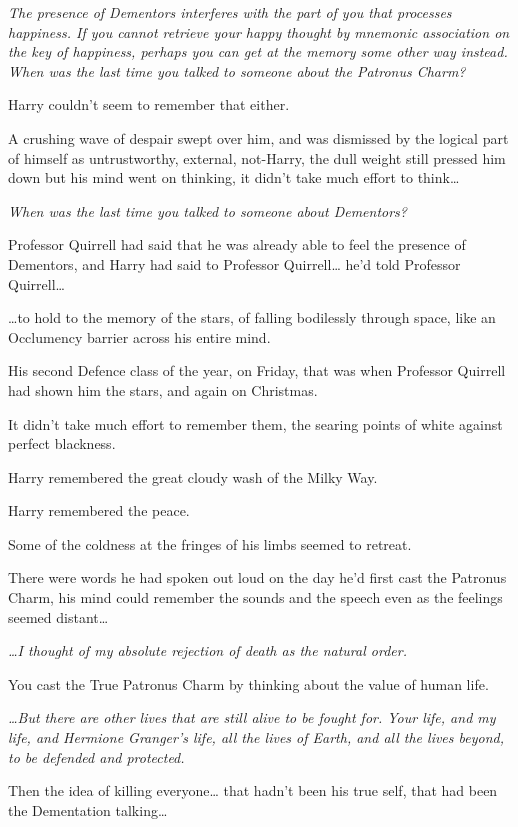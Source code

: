 \emph{The presence of Dementors interferes with the part of you that
processes happiness. If you cannot retrieve your happy thought by
mnemonic association on the key of happiness, perhaps you can get at the
memory some other way instead. When was the last time you talked to
someone about the Patronus Charm?}

Harry couldn't seem to remember that either.

A crushing wave of despair swept over him, and was dismissed by the
logical part of himself as untrustworthy, external, not-Harry, the dull
weight still pressed him down but his mind went on thinking, it didn't
take much effort to think\ldots{}

\emph{When was the last time you talked to someone about Dementors?}

Professor Quirrell had said that he was already able to feel the
presence of Dementors, and Harry had said to Professor Quirrell\ldots{}
he'd told Professor Quirrell\ldots{}

\ldots{}to hold to the memory of the stars, of falling bodilessly
through space, like an Occlumency barrier across his entire mind.

His second Defence class of the year, on Friday, that was when Professor
Quirrell had shown him the stars, and again on Christmas.

It didn't take much effort to remember them, the searing points of white
against perfect blackness.

Harry remembered the great cloudy wash of the Milky Way.

Harry remembered the peace.

Some of the coldness at the fringes of his limbs seemed to retreat.

There were words he had spoken out loud on the day he'd first cast the
Patronus Charm, his mind could remember the sounds and the speech even
as the feelings seemed distant\ldots{}

\emph{\ldots{}I thought of my absolute rejection of death as the natural
order.}

You cast the True Patronus Charm by thinking about the value of human
life.

\emph{\ldots{}But there are other lives that are still alive to be
fought for. Your life, and my life, and Hermione Granger's life, all the
lives of Earth, and all the lives beyond, to be defended and protected.}

Then the idea of killing everyone\ldots{} that hadn't been his true
self, that had been the Dementation talking\ldots{}

